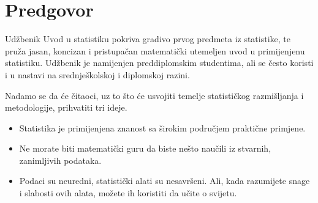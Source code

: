 \chapter*{{\color{oiB}Predgovor}}

\noindent%
Udžbenik Uvod u statistiku pokriva gradivo prvog predmeta iz statistike,
te pruža jasan, koncizan i pristupačan matematički utemeljen uvod u primijenjenu statistiku.
Udžbenik je namijenjen preddiplomskim studentima,
ali se često koristi i u nastavi na srednješkolskoj i diplomskoj razini.
\vspace{3mm}

Nadamo se da će čitaoci, uz to što će usvojiti temelje statističkog razmišljanja i metodologije, prihvatiti tri ideje.\vspace{-1mm}
\begin{itemize}
\setlength{\itemsep}{0mm}
\item
    Statistika je primijenjena znanost sa širokim područjem praktične primjene.
\item
    Ne morate biti matematički guru da biste nešto naučili iz stvarnih, zanimljivih podataka.
\item
    Podaci su neuredni, statistički alati su nesavršeni.
    Ali, kada razumijete snage i slabosti ovih alata, možete ih koristiti da učite o svijetu.
\end{itemize}


%
%
%


